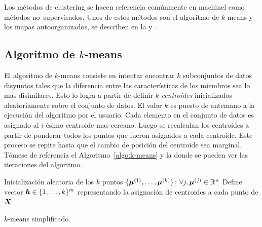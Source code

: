 Los métodos de clustering se hacen referencia comúnmente en \gls{machinel} como métodos no--supervisados. Unos de estos métodos son el algoritmo de $k$-means y los mapas autoorganizados, se describen en la  y .


\subsection{Algoritmo de $k$-means} \label{ch:k-means}
El algoritmo de $k$-means consiste en intentar encontrar $k$ subconjuntos de datos disyuntos tales que la diferencia entre las características de los miembros sea lo mas disimilares. Esto lo logra a partir de definir $k$ \textit{centroides} inicializados aleatoriamente sobre el conjunto de datos. El valor $k$ es puesto de antemano a la ejecución del algoritmo por el usuario. Cada elemento en el conjunto de datos es asignado al $i$-ésimo centroide mas cercano. Luego se recalculan los centroides a partir de ponderar todos los puntos que fueron asignados a cada centroide. Este proceso se repite hasta que el cambio de posición del centroide sea marginal. Tómese de referencia el Algoritmo~\ref{algo:k-means} y la  donde se pueden ver las iteraciones del algoritmo.

\IncMargin{1em}
\begin{algorithm}[H]
  
  Inicialización aleatoria de los $k$ puntos $\{ {\bm{\mu}}^{(1)}, \ldots, {\bm{\mu}}^{(k)} \} \,;\, \forall j, {\bm{\mu}}^{(j)} \in \mathbb{R}^{n}$\;
  Define vector ${\bm{h}} \in \{1, \ldots, k\}^{m}$ representando la asignación de centroides a cada punto de ${\bm{X}}$\;
  
  \caption{$k$-means simplificado.}
  \label{algo:k-means}
\end{algorithm}
\DecMargin{1em}

